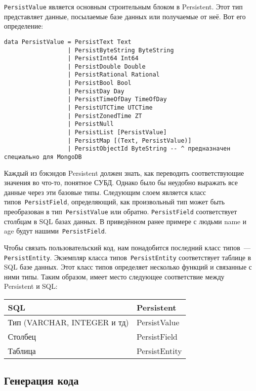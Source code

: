 \lstinline'PersistValue' является основным строительным блоком в Persistent.
Этот тип представляет данные, посылаемые базе данных или получаемые от неё. Вот
его определение:

\begin{lstlisting}
data PersistValue = PersistText Text
                  | PersistByteString ByteString
                  | PersistInt64 Int64
                  | PersistDouble Double
                  | PersistRational Rational
                  | PersistBool Bool
                  | PersistDay Day
                  | PersistTimeOfDay TimeOfDay
                  | PersistUTCTime UTCTime
                  | PersistZonedTime ZT
                  | PersistNull
                  | PersistList [PersistValue]
                  | PersistMap [(Text, PersistValue)]
                  | PersistObjectId ByteString -- ^ предназначен специально для MongoDB
\end{lstlisting}

Каждый из бэкэндов Persistent должен знать, как переводить соответствующие
значения во что-то, понятное СУБД. Однако было бы неудобно выражать все данные
через эти базовые типы. Следующим слоем является класс
типов~\lstinline'PersistField', определяющий, как произвольный тип может быть
преобразован в тип~\lstinline'PersistValue' или обратно.
\lstinline'PersistField' соответствует столбцам в SQL базах данных. В
приведённом ранее примере с людьми name и age будут
нашими~\lstinline'PersistField'.

Чтобы связать пользовательский код, нам понадобится последний класс типов~---
\lstinline'PersistEntity'. Экземпляр класса типов~\lstinline'PersistEntity'
соответствует таблице в SQL базе данных. Этот класс типов определяет несколько
функций и связанные с ними типы. Таким образом, имеет место следующее
соответствие между Persistent и SQL:

\begin{center}
\begin{tabular}{ | l | l |}
\hline
SQL	& Persistent \\ \hline
Тип (VARCHAR, INTEGER и тд)	& PersistValue \\ \hline
Столбец & PersistField \\ \hline
Таблица	& PersistEntity \\ \hline
\end{tabular}
\end{center}

\subsection{Генерация кода}

